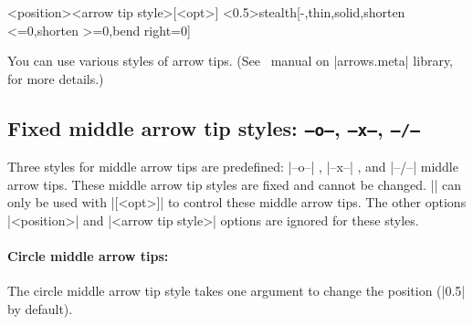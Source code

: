 \begin{tzdef}
\settzmidarrow<position>{<arrow tip style>}[<opt>]
  <0.5>{stealth}[-,thin,solid,shorten <=0,shorten >=0,bend right=0]
\end{tzdef}


\begin{tzcode}{.3}
{}
\end{tzcode}


\begin{tzcode}{.3}
\end{tzcode}

You can use various styles of arrow tips. (See \Tikz\ manual on |arrows.meta| library, for more details.)



\subsection{Fixed middle arrow tip styles: \texttt{--o--}, \texttt{--x--}, \texttt{--/--}}

Three styles for middle arrow tips are predefined:  |--o--| ,  |--x--| , and  |--/--| middle arrow tips.
These middle arrow tip styles are fixed and cannot be changed.
|\settzmidarrow| can only be used with |[<opt>]| to control these middle arrow tips.
The other options |<position>| and |{<arrow tip style>}| options are ignored for these styles.

\paragraph{Circle middle arrow tips:}

The circle middle arrow tip style  takes one argument to change the position (|0.5| by default).

